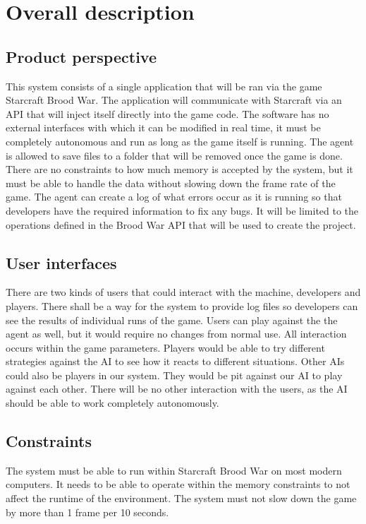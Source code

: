 \section{Overall description}

\subsection{Product perspective}
This system consists of a single application that will be ran via the game Starcraft Brood War.
The application will communicate with Starcraft via an API that will inject itself directly into the game code.
The software has no external interfaces with which it can be modified in real time, it must be completely autonomous and run as long as the game itself is running.
The agent is allowed to save files to a folder that will be removed once the game is done. There are no constraints to how much memory is accepted by the system,
but it must be able to handle the data without slowing down the frame rate of the game.
The agent can create a log of what errors occur as it is running so that developers have the required information to fix any bugs.
It will be limited to the operations defined in the Brood War API that will be used to create the project.

\subsection{User interfaces}
There are two kinds of users that could interact with the machine, developers and players.
There shall be a way for the system to provide log files so developers can see the results of individual runs of the game.
Users can play against the the agent as well, but it would require no changes from normal use. All interaction occurs within the game parameters.
Players would be able to try different strategies against the AI to see how it reacts to different situations.
Other AIs could also be players in our system. They would be pit against our AI to play against each other.
There will be no other interaction with the users, as the AI should be able to work completely autonomously.

\subsection{Constraints}
The system must be able to run within Starcraft Brood War on most modern computers. It needs to be able to operate within the memory constraints to not affect the runtime of the environment.
The system must not slow down the game by more than 1 frame per 10 seconds. 

